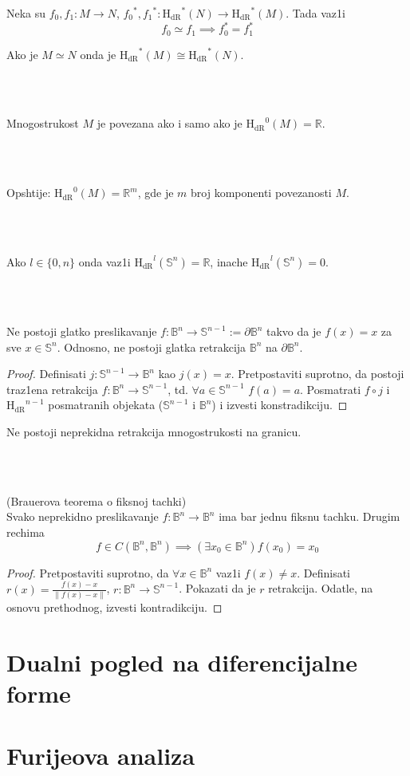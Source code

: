 \documentclass[a4paper,12pt]{article}
\newcommand{\RR}{\mathbb{R}}
\newcommand{\norm}[1]{\left\lVert#1\right\rVert}
\newcommand{\hdr}[1]{{\mathrm{H_{dR}}}^{#1}}
\begin{document}
\begin{posl}
Neka su $f_0, f_1 : M \to N$, ${f_0}^*, {f_1}^* : \hdr{*}(N)\to \hdr{*}(M)$. Tada vaz1i 
\[f_0 \simeq f_1 \implies f_0^* = f_1^*\]
\end{posl}

\begin{posl}
Ako je $M \simeq N$ onda je $\hdr{*}(M) \cong \hdr{*}(N)$.
\end{posl}
\\ \\
\begin{nap}
Mnogostrukost $M$ je povezana ako  i samo ako je $\hdr{0} (M) = \RR$. 
\end{nap}
\\ \\
\begin{nap}
Opshtije: $\hdr{0} (M) = \RR^m$, gde je $m$ broj komponenti povezanosti $M$.
\end{nap}
\\ \\
\begin{nap}
Ako $l \in \{0,n\}$ onda vaz1i $\hdr{l} (\mathbb{S}^n) = \RR$, inache $\hdr{l} (\mathbb{S}^n) = 0$.
\end{nap}
\\ \\
\begin{tvr}
Ne postoji glatko preslikavanje $f: \mathbb{B}^n \to \mathbb{S}^{n-1} := \partial \mathbb{B}^n$ takvo da je $f(x) = x$ za sve $x \in \mathbb{S}^n$. Odnosno, ne postoji glatka retrakcija $\mathbb{B}^n$ na $\partial \mathbb{B}^n$.
\end{tvr}
\begin{proof}
Definisati $j: \mathbb{S}^{n-1} \to \mathbb{B}^n$ kao $j(x) = x$. Pretpostaviti suprotno, da postoji traz1ena retrakcija $f: \mathbb{B}^n \to \mathbb{S}^{n-1}$, td. $\forall a \in \mathbb{S}^{n-1}$ $f(a) = a$. Posmatrati $f \circ j$ i $\hdr{n-1}$ posmatranih objekata ($\mathbb{S}^{n-1}$ i $\mathbb{B}^n$) i izvesti konstradikciju.
\end{proof}
\begin{nap}
Ne postoji neprekidna retrakcija mnogostrukosti na granicu.
\end{nap}
\\ \\
\begin{tma}
(Brauerova teorema o fiksnoj tachki) \\ Svako neprekidno preslikavanje $f: \mathbb{B}^n \to \mathbb{B}^n$ ima bar jednu fiksnu tachku. Drugim rechima
\[f \in C(\mathbb{B}^n, \mathbb{B}^n) \implies (\exists x_0 \in \mathbb{B}^n) f(x_0) = x_0 \]
\end{tma}
\begin{proof}
Pretpostaviti suprotno, da $\forall x \in \mathbb{B}^n$ vaz1i $f(x) \ne x$. Definisati $r(x) = \frac{f(x) - x}{\norm{f(x) - x}}$, $r: \mathbb{B}^n \to \mathbb{S}^{n-1}$. Pokazati da je $r$ retrakcija. Odatle, na osnovu prethodnog, izvesti kontradikciju.
\end{proof}

\section{Dualni pogled na diferencijalne forme}
\section{Furijeova analiza}
\end{document}
